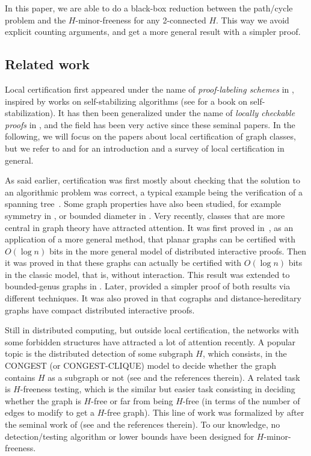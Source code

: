 \documentclass[a4paper,thm-restate,USenglish]{lipics-v2019}
\begin{document}
In this paper, we are able to do a black-box reduction between the path/cycle problem and the $H$-minor-freeness for any 2-connected $H$. This way we avoid explicit counting arguments, and get a more general result with a simpler proof.

\subsection{Related work}

Local certification first appeared under the name of \emph{proof-labeling schemes} in \cite{KormanKP10}, inspired by works on self-stabilizing algorithms (see \cite{Dolev2000} for a book on self-stabilization).
It has then been generalized under the name of \emph{locally checkable proofs} in \cite{GoosS16}, and the field has been very active since these seminal papers. 
In the following, we will focus on the papers about local certification of graph classes, but we refer to \cite{Feuilloley19} and \cite{FeuilloleyF16} for an introduction and a survey of local certification in general.

As said earlier, certification was first mostly about checking that the solution to an algorithmic problem was correct, a typical example being the verification of a spanning tree~\cite{KormanKP10}. 
Some graph properties have also been studied, for example symmetry in \cite{GoosS16}, or bounded diameter in \cite{Censor-HillelPP20}. 
Very recently, classes that are more central in graph theory have attracted attention. 
It was first proved in~\cite{NaorPY20}, as an application of a more general method, that planar graphs can be certified with $O(\log n)$ bits in the more general model of distributed interactive proofs. 
Then it was proved in \cite{FeuilloleyFMRRT20} that these graphs can actually be certified with $O(\log n)$ bits in the classic model, that is, without interaction. This result was extended to bounded-genus graphs in \cite{FeuilloleyFMRRT21}.
Later, \cite{EsperetL21} provided a simpler proof of both results via different techniques. It was also proved in \cite{MontealegreRR20} that cographs and distance-hereditary graphs have compact distributed  interactive proofs. 

Still in distributed computing, but outside local certification, the networks with some forbidden structures have attracted a lot of attention recently. 
A popular topic is the distributed detection of some subgraph $H$, which consists, in the CONGEST (or CONGEST-CLIQUE) model to decide whether the graph contains $H$ as a subgraph or not (see \cite{Censor-HillelFG20} and the references therein).
A related task is $H$-freeness testing, which is the similar but easier task consisting in deciding whether the graph is $H$-free or far from being $H$-free (in terms of the number of edges to modify to get a $H$-free graph). This line of work was formalized by \cite{Censor-HillelFS19} after the seminal work of \cite{BrakerskiP11} (see \cite{FraigniaudO19} and the references therein).
To our knowledge, no detection/testing algorithm or lower bounds have been designed for $H$-minor-freeness.
\end{document}
